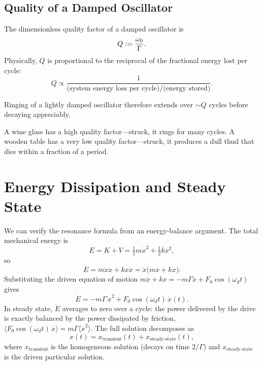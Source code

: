 \subsection{Quality of a Damped Oscillator}

\begin{definition}
The dimensionless quality factor of a damped oscillator is
\begin{equation}
    Q \vcentcolon= \frac{\omega_0}{\Gamma}.
\end{equation}
Physically, $Q$ is proportional to the reciprocal of the fractional energy lost per cycle:
\begin{equation}
    Q \propto \frac{1}{\text{(system energy loss per cycle)}/\text{(energy stored)}}.
\end{equation}
\end{definition}

Ringing of a lightly damped oscillator therefore extends over $\sim Q$ cycles before decaying appreciably.

\begin{example}
A wine glass has a high quality factor---struck, it rings for many cycles. A wooden table has a very low quality factor---struck, it produces a dull thud that dies within a fraction of a period.
\end{example}

\section{Energy Dissipation and Steady State}

We can verify the resonance formula from an energy-balance argument. The total mechanical energy is
\begin{equation}
    E = K + V = \tfrac{1}{2}m\dot{x}^2 + \tfrac{1}{2}kx^2,
\end{equation}
so
\begin{equation}
    \dot{E} = m\dot{x}\ddot{x} + kx\dot{x} = \dot{x}\bigl(m\ddot{x} + kx\bigr).
\end{equation}
Substituting the driven equation of motion $m\ddot{x} + kx = -m\Gamma\dot{x} + F_0\cos(\omega_d t)$ gives
\begin{equation}
    \dot{E} = -m\Gamma\,\dot{x}^2 + F_0\cos(\omega_d t)\,\dot{x}(t).
\end{equation}
In steady state, $\dot{E}$ averages to zero over a cycle: the power delivered by the drive is exactly balanced by the power dissipated by friction, $\langle F_0\cos(\omega_d t)\,\dot{x}\rangle = m\Gamma\langle \dot{x}^2\rangle$. The full solution decomposes as
\begin{equation}
    x(t) = x_\text{transient}(t) + x_\text{steady-state}(t),
\end{equation}
where $x_\text{transient}$ is the homogeneous solution (decays on time $2/\Gamma$) and $x_\text{steady-state}$ is the driven particular solution.

